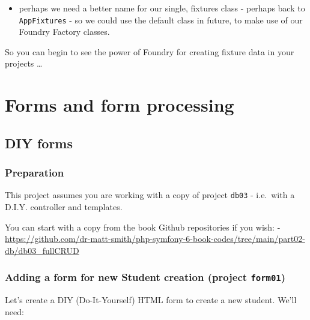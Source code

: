 \documentclass[a4paperpaper,openright]{book}
\providecommand{\tightlist}{%
  \setlength{\itemsep}{0pt}\setlength{\parskip}{0pt}}
\begin{document}
\begin{itemize}
\tightlist
\item
  perhaps we need a better name for our single, fixtures class - perhaps
  back to \texttt{AppFixtures} - so we could use the default class in
  future, to make use of our Foundry Factory classes.
\end{itemize}

So you can begin to see the power of Foundry for creating fixture data
in your projects \ldots{}

\part{Forms and form processing}

\hypertarget{diy-forms}{%
\chapter{DIY forms}\label{diy-forms}}

\hypertarget{preparation}{%
\section{Preparation}\label{preparation}}

This project assumes you are working with a copy of project
\texttt{db03} - i.e.~with a D.I.Y. controller and templates.

You can start with a copy from the book Github repositories if you wish:
-
\url{https://github.com/dr-matt-smith/php-symfony-6-book-codes/tree/main/part02-db/db03_fullCRUD}

\hypertarget{adding-a-form-for-new-student-creation-project-form01}{%
\section{\texorpdfstring{Adding a form for new Student creation (project
\texttt{form01})}{Adding a form for new Student creation (project form01)}}\label{adding-a-form-for-new-student-creation-project-form01}}

Let's create a DIY (Do-It-Yourself) HTML form to create a new student.
We'll need:
\end{document}
